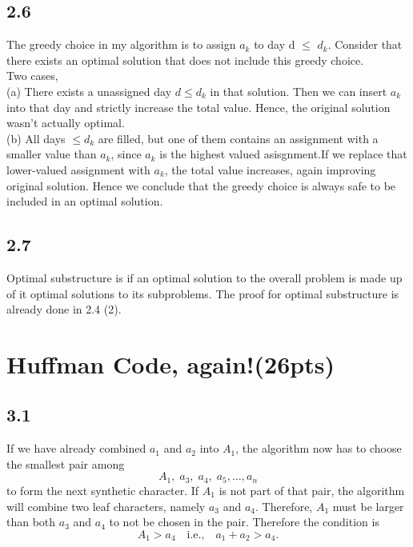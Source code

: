 \documentclass{article}[12pt]
\begin{document}
\subsection*{2.6}
The greedy choice in my algorithm is to assign $a_k$ to day d $\le$ $d_k$. 
Consider that there exists an optimal solution that does not include this greedy choice. \\
Two cases, \\
(a) There exists a unassigned day $d \le d_k$ in that solution. Then we can insert $a_k$ into that day and strictly increase the total value. Hence, the original solution wasn’t actually optimal.\\
(b) All days $\le d_k$ are filled, but one of them contains an assignment with a smaller value than $a_k$, since $a_k$ is the highest valued asisgnment.If we replace that lower-valued assignment with $a_k$, the total value increases, again improving  original solution.
Hence we conclude that the greedy choice is always safe to be included in an optimal solution.

\subsection*{2.7}
Optimal substructure is if an optimal solution to the overall problem is made up of it optimal solutions to its subproblems.
The proof for optimal substructure is already done in 2.4 (2).

\section{Huffman Code, again!(26pts)}
\subsection*{3.1} If we have already combined $a_1$ and $a_2$ into $A_1$, 
the algorithm now has to choose the smallest pair among 
\[
A_1, \; a_3, \; a_4, \; a_5, \dots, a_n
\] 
to form the next synthetic character. 
If $A_1$ is not part of that pair, the algorithm will combine 
two leaf characters, namely $a_3$ and $a_4$. 
Therefore, $A_1$ must be larger than both $a_3$ and $a_4$ to not be chosen in the pair.
Therefore the condition is 
\[
A_1 > a_4 \quad \text{i.e.,} \quad a_1 + a_2 > a_4.
\] 
\end{document}
